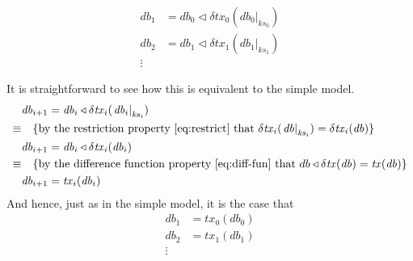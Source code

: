 \documentclass[11pt,a4paper]{article}
\newcommand\restrict[2]{\left.#1\right|_{#2}}
\begin{document}
\begin{center}
\begin{align*}
 \mathit{db}_1 & = \mathit{db}_0 \triangleleft \delta\mathit{tx}_0(\restrict{\mathit{db}_0}{\mathit{ks}_0}) \\
 \mathit{db}_2 & = \mathit{db}_1 \triangleleft \delta\mathit{tx}_1(\restrict{\mathit{db}_1}{\mathit{ks}_1}) \\
 \vdots
\end{align*}
\end{center}
It is straightforward to see how this is equivalent to the simple model.
\begin{align*}
       & \mathit{db}_{i+1} = \mathit{db}_i \triangleleft \delta\mathit{tx}_i(\restrict{\mathit{db}_i}{\mathit{ks}_i}) \\
\equiv & \quad \text{\{by the restriction property \cref{eq:restrict} that
                     $\delta\mathit{tx}_i(\restrict{\mathit{db}}{\mathit{ks}_i}) = \delta\mathit{tx}_i(\mathit{db})$\}} \\
       & \mathit{db}_{i+1} = \mathit{db}_i \triangleleft \delta\mathit{tx}_i(\mathit{db}_i) \\
\equiv & \quad \text{\{by the difference function property \cref{eq:diff-fun} that
                     $db \triangleleft \delta\mathit{tx}(\mathit{db}) = \mathit{tx}(\mathit{db})$\}} \\
       & \mathit{db}_{i+1} = \mathit{tx}_i(\mathit{db}_i)
\end{align*}
And hence, just as in the simple model, it is the case that
\begin{align*}
 \mathit{db}_1 & = \mathit{tx}_0(\mathit{db}_0) \\
 \mathit{db}_2 & = \mathit{tx}_1(\mathit{db}_1) \\
 \vdots
\end{align*}
\end{document}
